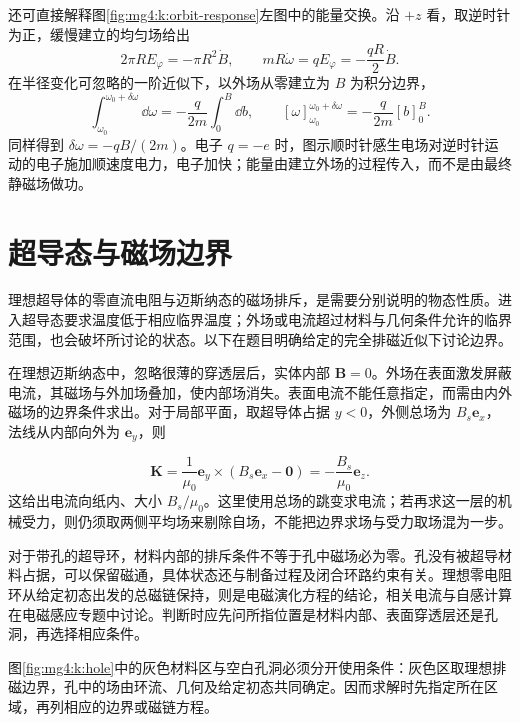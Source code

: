 还可直接解释图\ref{fig:mg4:k:orbit-response}左图中的能量交换。沿 $+z$ 看，取逆时针为正，缓慢建立的均匀场给出
\[
2\pi R E_\varphi=-\pi R^2\dot B,\qquad
mR\dot\omega=qE_\varphi=-\frac{qR}{2}\dot B.
\]
在半径变化可忽略的一阶近似下，以外场从零建立为 $B$ 为积分边界，
\[
 \int_{\omega_0}^{\omega_0+\delta\omega}\dd\omega
 =-\frac q{2m}\int_0^B\dd b,\qquad
 [\omega]_{\omega_0}^{\omega_0+\delta\omega}
 =-\frac q{2m}[b]_0^B.
\]
同样得到 $\delta\omega=-qB/(2m)$。电子 $q=-e$ 时，图示顺时针感生电场对逆时针运动的电子施加顺速度电力，电子加快；能量由建立外场的过程传入，而不是由最终静磁场做功。

\section{超导态与磁场边界}
理想超导体的零直流电阻与迈斯纳态的磁场排斥，是需要分别说明的物态性质。进入超导态要求温度低于相应临界温度；外场或电流超过材料与几何条件允许的临界范围，也会破坏所讨论的状态。以下在题目明确给定的完全排磁近似下讨论边界。


在理想迈斯纳态中，忽略很薄的穿透层后，实体内部 $\bm B=0$。外场在表面激发屏蔽电流，其磁场与外加场叠加，使内部场消失。表面电流不能任意指定，而需由内外磁场的边界条件求出。对于局部平面，取超导体占据 $y<0$，外侧总场为 $B_s\bm e_x$，法线从内部向外为 $\bm e_y$，则

\[
\bm K=\frac1{\mu_0}\bm e_y\times(B_s\bm e_x-\bm0)
=-\frac{B_s}{\mu_0}\bm e_z.
\]
这给出电流向纸内、大小 $B_s/\mu_0$。这里使用总场的跳变求电流；若再求这一层的机械受力，则仍须取两侧平均场来剔除自场，不能把边界求场与受力取场混为一步。


对于带孔的超导环，材料内部的排斥条件不等于孔中磁场必为零。孔没有被超导材料占据，可以保留磁通，具体状态还与制备过程及闭合环路约束有关。理想零电阻环从给定初态出发的总磁链保持，则是电磁演化方程的结论，相关电流与自感计算在电磁感应专题中讨论。判断时应先问所指位置是材料内部、表面穿透层还是孔洞，再选择相应条件。


图\ref{fig:mg4:k:hole}中的灰色材料区与空白孔洞必须分开使用条件：灰色区取理想排磁边界，孔中的场由环流、几何及给定初态共同确定。因而求解时先指定所在区域，再列相应的边界或磁链方程。




